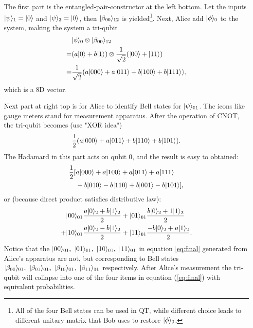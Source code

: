 		The first part is the entangled-pair-constructor at the left bottom. 
		Let the inputs $|{\psi} \rangle_1 = |{0} \rangle$ and $|{\psi} \rangle_2=|{0} \rangle$, then 
		$|{\beta_{00}} \rangle_{12}$ is yielded\footnote{
		All of the four Bell states can be used in QT, while different choice leads to 
		different unitary matrix that Bob uses to restore $|{\phi} \rangle_0$.}.  
		Next, Alice add $|{\phi} \rangle_0$ to the system, making the system a tri-qubit
		\begin{equation}
			\begin{split}
			&|{\phi} \rangle_0 \otimes |{\beta_{00}} \rangle_{12} \\
				=&(a|{0} \rangle+b|{1} \rangle) \otimes \frac{1}{\sqrt{2}} (|{00} \rangle+|{11} \rangle)\\
				=&\frac{1}{\sqrt{2}} (a|{000} \rangle+a|{011} \rangle+b|{100} \rangle+b|{111} \rangle),
			\end{split}
		\end{equation}
		which is a 8D vector.

		Next part at right top is for Alice to identify Bell states for $|{\psi} \rangle_{01}$. The icons like gauge meters stand for measurement apparatus. After the operation of CNOT, the tri-qubit becomes (use "XOR idea")
		\begin{equation}
		\frac{1}{2}(a|{000} \rangle+a|{011} \rangle+b|{110} \rangle+b|{101} \rangle).
		\end{equation}
		The Hadamard in this part acts on qubit $0$, and the result is easy to obtained:
		\begin{equation} 
			\begin{split}
				\frac{1}{2}[&a|{000} \rangle+a|{100} \rangle+a|{011} \rangle+a|{111} \rangle\\
						&+b|{010} \rangle-b|{110} \rangle+b|{001} \rangle-b|{101} \rangle],
			\end{split}
		\end{equation}
		or (because direct product satisfies distributive law):
		\begin{equation}
		\label{eq:final}
		\begin{split}
		 &|{00} \rangle_{01}\frac{a|{0} \rangle_2+b|{1} \rangle_2}{2} +|{01} \rangle_{01}\frac{b|{0} \rangle_2+1|{1} \rangle_2}{2} \\
		 +&|{10} \rangle_{01}\frac{a|{0} \rangle_2-b|{1} \rangle_2}{2}+|{11} \rangle_{01}\frac{-b|{0} \rangle_2+a|{1} \rangle_2}{2} .
		 \end{split}
		\end{equation}
		Notice that the $\bra{00}_{01},\ \bra{01}_{01},\ \bra{10}_{01},\ \bra{11}_{01}$ in equation \ref{eq:final} generated from Alice's apparatus are not, but corresponding to Bell states 
		$\bra{\beta_{00}}_{01},\ \bra{\beta_{01}}_{01},\ \bra{\beta_{10}}_{01},\ \bra{\beta_{11}}_{01}$ respectively. After Alice's measurement the tri-qubit will collapse into one of the 
		four items in equation (\ref{eq:final}) with equivalent probabilities. 

